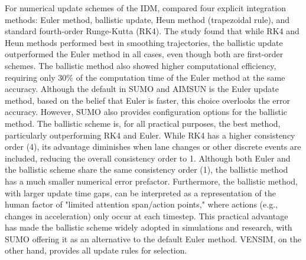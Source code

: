 \documentclass[a4paper,fleqn]{cas-sc}
\begin{document}
For numerical update schemes of the IDM, \cite{treiberComparingNumericalIntegrationSchemes2015} compared four explicit integration methods: Euler method, ballistic update, Heun method (trapezoidal rule), and standard fourth-order Runge-Kutta (RK4). The study found that while RK4 and Heun methods performed best in smoothing trajectories, the ballistic update outperformed the Euler method in all cases, even though both are first-order schemes. The ballistic method also showed higher computational efficiency, requiring only 30\% of the computation time of the Euler method at the same accuracy. Although the default in SUMO and AIMSUN is the Euler update method, based on the belief that Euler is faster, this choice overlooks the error accuracy. However, SUMO also provides configuration options for the ballistic method. The ballistic scheme is, for all practical purposes, the best method, particularly outperforming RK4 and Euler. While RK4 has a higher consistency order (4), its advantage diminishes when lane changes or other discrete events are included, reducing the overall consistency order to 1. Although both Euler and the ballistic scheme share the same consistency order (1), the ballistic method has a much smaller numerical error prefactor. Furthermore, the ballistic method, with larger update time gaps, can be interpreted as a representation of the human factor of "limited attention span/action points," where actions (e.g., changes in acceleration) only occur at each timestep. This practical advantage has made the ballistic scheme widely adopted in simulations and research, with SUMO offering it as an alternative to the default Euler method. VENSIM, on the other hand, provides all update rules for selection.
\end{document}
